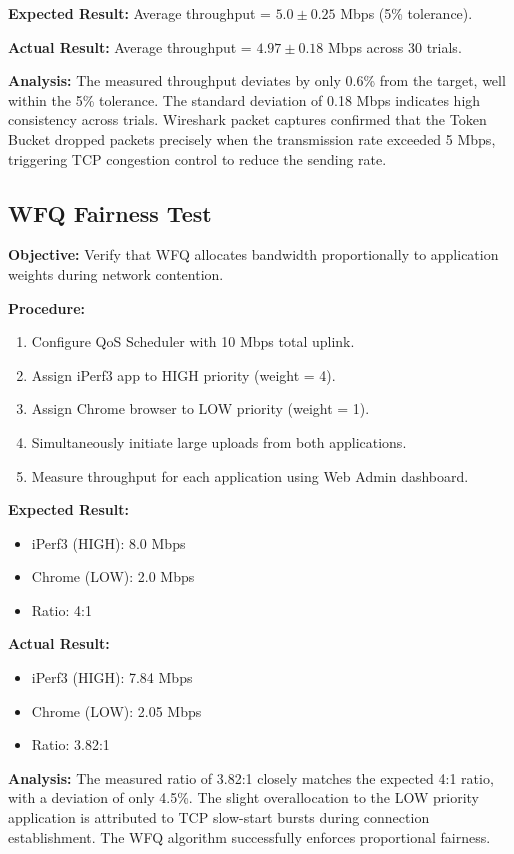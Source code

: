 \textbf{Expected Result:} Average throughput = $5.0 \pm 0.25$ Mbps (5\% tolerance).

\textbf{Actual Result:} Average throughput = $4.97 \pm 0.18$ Mbps across 30 trials.

\textbf{Analysis:} The measured throughput deviates by only 0.6\% from the target, well within the 5\% tolerance. The standard deviation of 0.18 Mbps indicates high consistency across trials. Wireshark packet captures confirmed that the Token Bucket dropped packets precisely when the transmission rate exceeded 5 Mbps, triggering TCP congestion control to reduce the sending rate.

\subsection{WFQ Fairness Test}

\textbf{Objective:} Verify that WFQ allocates bandwidth proportionally to application weights during network contention.

\textbf{Procedure:}
\begin{enumerate}
    \item Configure QoS Scheduler with 10 Mbps total uplink.
    \item Assign iPerf3 app to HIGH priority (weight = 4).
    \item Assign Chrome browser to LOW priority (weight = 1).
    \item Simultaneously initiate large uploads from both applications.
    \item Measure throughput for each application using Web Admin dashboard.
\end{enumerate}

\textbf{Expected Result:} 
\begin{itemize}
    \item iPerf3 (HIGH): 8.0 Mbps
    \item Chrome (LOW): 2.0 Mbps
    \item Ratio: 4:1
\end{itemize}

\textbf{Actual Result:}
\begin{itemize}
    \item iPerf3 (HIGH): 7.84 Mbps
    \item Chrome (LOW): 2.05 Mbps
    \item Ratio: 3.82:1
\end{itemize}

\textbf{Analysis:} The measured ratio of 3.82:1 closely matches the expected 4:1 ratio, with a deviation of only 4.5\%. The slight overallocation to the LOW priority application is attributed to TCP slow-start bursts during connection establishment. The WFQ algorithm successfully enforces proportional fairness.

